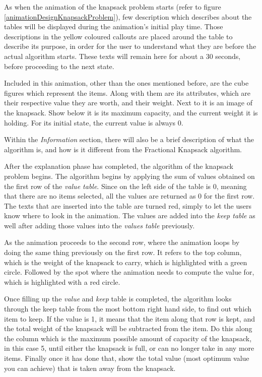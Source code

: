 As when the animation of the knapsack problem starts (refer to figure \ref{animationDesignKnapsackProblem}), few description which describes about the tables will be displayed during the animation's initial play time. Those descriptions in the yellow coloured callouts are placed around the table to describe its purpose, in order for the user to understand what they are before the actual algorithm starts. These texts will remain here for about a 30 seconds, before proceeding to the next state.

Included in this animation, other than the ones mentioned before, are the cube figures which represent the items. Along with them are its attributes, which are their respective value they are worth, and their weight. Next to it is an image of the knapsack. Show below it is its maximum capacity, and the current weight it is holding. For its initial state, the current value is always 0.

Within the \textit{Information} section, there will also be a brief description of what the algorithm is, and how is it different from the Fractional Knapsack algorithm. 

After the explanation phase has completed, the algorithm of the knapsack problem begins. The algorithm begins by applying the sum of values obtained on the first row of the \textit{value table}. Since on the left side of the table is 0, meaning that there are no items selected, all the values are returned as 0 for the first row. The texts that are inserted into the table are turned red, simply to let the users know where to look in the animation. The values are added into the \textit{keep table} as well after adding those values into the \textit{values table} previously.

As the animation proceeds to the second row, where the animation loops by doing the same thing previously on the first row. It refers to the top column, which is the weight of the knapsack to carry, which is highlighted with a green circle. Followed by the spot where the animation needs to compute the value for, which is highlighted with a red circle. 

Once filling up the \textit{value} and \textit{keep} table is completed, the algorithm looks through the keep table from the most bottom right hand side, to find out which item to keep. If the value is 1, it means that the item along that row is kept, and the total weight of the knapsack will be subtracted from the item. Do this along the column which is the maximum possible amount of capacity of the knapsack, in this case 5, until either the knapsack is full, or can no longer take in any more items. Finally once it has done that, show the total value (most optimum value you can achieve) that is taken away from the knapsack.

